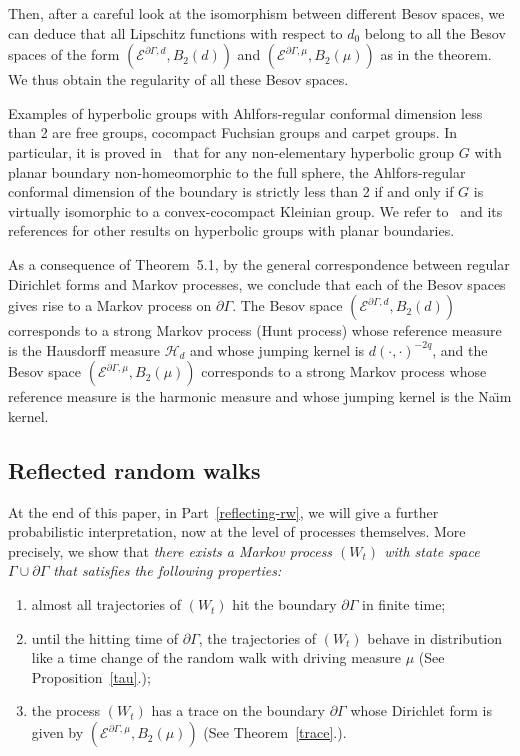 \documentclass[AHL,Unicode,longabstracts,published]{cedram}
\newcommand{\ce}{\mathcal{E}}
\newcommand{\ch}{\mathcal{H}}
\newcommand*{\romanenumi}{\renewcommand*{\theenumi}{\roman{enumi}}}
\begin{document}
Then, after a careful look at the isomorphism between different Besov spaces, we can deduce that all Lipschitz functions with respect to $d_0$ belong to all the Besov spaces of the form $(\ce^{\partial\Gamma,d},B_2(d))$ and $(\ce^{\partial\Gamma,\mu},B_2(\mu))$ as in the theorem. We thus obtain the regularity of all these Besov spaces.



Examples of hyperbolic groups with Ahlfors-regular conformal dimension less than 2 are free groups, cocompact Fuchsian groups and carpet groups. In particular, it is proved in~\cite{Ha1} that for any non-elementary hyperbolic group $G$ with planar boundary non-homeomorphic to the full sphere, the Ahlfors-regular conformal dimension of the boundary is strictly less than 2 if and only if $G$ is virtually isomorphic to a convex-cocompact Kleinian group. We refer to~\cite{Ha1} and its references for other results on hyperbolic groups with planar boundaries.



As a consequence of Theorem~5.1, by the general correspondence between regular Dirichlet forms and Markov processes, we conclude that each of the Besov spaces gives rise to a Markov process on $\partial \Gamma$. The Besov space $(\ce^{\partial\Gamma,d},B_2(d))$ corresponds to a strong Markov process (Hunt process) whose reference measure is the Hausdorff measure $\ch_{d}$ and whose jumping kernel is $d(\cdot,\cdot)^{-2q}$, and the Besov space $(\ce^{\partial\Gamma,\mu},B_2(\mu))$ corresponds to a strong Markov process whose reference measure is the harmonic measure and whose jumping kernel is the Na{\"\i}m kernel. 



\subsection*{Reflected random walks}

At the end of this paper, in Part~\ref{reflecting-rw}, we will give a further probabilistic interpretation, now at the level of processes themselves. More precisely, we show that \emph{there exists a Markov process $(W_t)$ with state space $\Gamma\cup\partial\Gamma$ that satisfies the following properties:}
\begin{enumerate}\romanenumi
\item almost all trajectories of $(W_t)$ hit the boundary $\partial\Gamma$ in finite time;

\item until the hitting time of $\partial\Gamma$, the trajectories of $(W_t)$ behave in distribution like a time change of the random walk with driving measure $\mu$ (See Proposition~\ref{tau}.);

\item the process $(W_t)$ has a trace on the boundary $\partial\Gamma$ whose Dirichlet form is given by $(\ce^{\partial\Gamma,\mu},B_2(\mu))$ (See Theorem~\ref{trace}.).
\end{enumerate}
\end{document}
